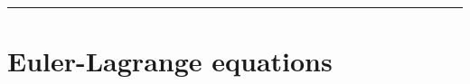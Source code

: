 \documentclass{article}
\begin{document}
\begin{comment}
 &\left(\gls{molar-fraction}_i \gls{molar-fraction}_j w_{ij}\right) \left(\gls{molar-fraction}_i \gls{molar-fraction}_j \frac{d^2 w_{ij}}{d \| \gls{distance-vec}_{ij} \|^2} \right) \left(\gls{distance-vec}_{ij} \cdot \gls{distance-vec}_{ij}\right)^2\ \left(\gls{normalized-distance-vec}_{ij} \otimes \gls{normalized-distance-vec}_{ij}\right)\ +\ \\
 4&\left(\gls{molar-fraction}_i \gls{molar-fraction}_j w_{ij}\right) \left(\gls{molar-fraction}_i \gls{molar-fraction}_j \frac{d w_{ij}}{d \| \gls{distance-vec}_{ij} \|} \right) \left(\gls{distance-vec}_{ij} \cdot \gls{distance-vec}_{ij}\right)\ \left(\gls{normalized-distance-vec}_{ij} \otimes \gls{distance-vec}_{ij}\right)\ +\ \\ 
 &\left(\gls{molar-fraction}_i \gls{molar-fraction}_j w_{ij}\right) \left(\gls{molar-fraction}_i \gls{molar-fraction}_j \frac{d w_{ij}}{d \| \gls{distance-vec}_{ij} \|} \right) \left(\gls{distance-vec}_{ij} \cdot \gls{distance-vec}_{ij}\right)^2\ \frac{d^2 \| \gls{distance-vec}_{ij} \| }{d \gls{distance-vec}_{ij} d \gls{distance-vec}_{ij}}\ +\ \\ 
4&\left(\gls{molar-fraction}_i \gls{molar-fraction}_j w_{ij} \right) \left(\gls{molar-fraction}_i \gls{molar-fraction}_j \frac{d w_{ij}}{d \| \gls{distance-vec}_{ij} \|} \right) \left(\gls{distance-vec}_{ij} \cdot \gls{distance-vec}_{ij}\right) \left(\gls{distance-vec}_{ij} \otimes \gls{normalized-distance-vec}_{ij}\right)\ +\\
4&\left(\gls{molar-fraction}_i \gls{molar-fraction}_j w_{ij} \right)^2 \left(\gls{distance-vec}_{ij} \otimes \gls{distance-vec}_{ij}\right)\ +\ 2\left(\gls{molar-fraction}_i \gls{molar-fraction}_j w_{ij} \right)^2 \left(\gls{distance-vec}_{ij} \cdot \gls{distance-vec}_{ij}\right) \frac{d \gls{distance-vec}_{ij}}{d \gls{distance-vec}_{ij}}
\end{split}
\end{equation}
\end{comment}
\vspace{0.5cm}
\hrule
\vspace{0.5cm}

\newpage
\section{Euler-Lagrange equations}


\newpage
\printglossaries
\end{document}
